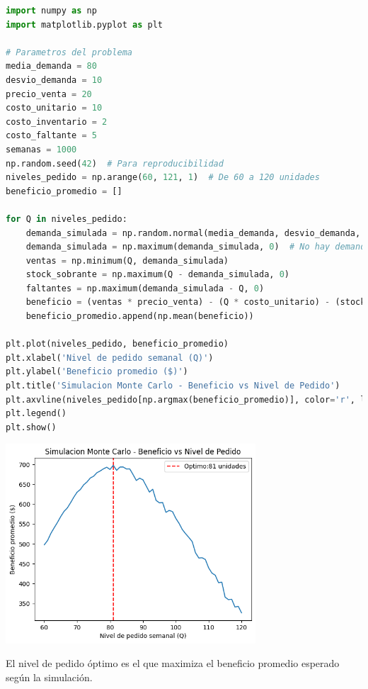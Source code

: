\documentclass[12pt]{article}
\begin{document}
\begin{lstlisting}[language=Python]
import numpy as np
import matplotlib.pyplot as plt

# Parametros del problema
media_demanda = 80
desvio_demanda = 10
precio_venta = 20
costo_unitario = 10
costo_inventario = 2
costo_faltante = 5
semanas = 1000
np.random.seed(42)  # Para reproducibilidad
niveles_pedido = np.arange(60, 121, 1)  # De 60 a 120 unidades
beneficio_promedio = []

for Q in niveles_pedido:
    demanda_simulada = np.random.normal(media_demanda, desvio_demanda, semanas).round().astype(int)
    demanda_simulada = np.maximum(demanda_simulada, 0)  # No hay demanda negativa
    ventas = np.minimum(Q, demanda_simulada)
    stock_sobrante = np.maximum(Q - demanda_simulada, 0)
    faltantes = np.maximum(demanda_simulada - Q, 0)
    beneficio = (ventas * precio_venta) - (Q * costo_unitario) - (stock_sobrante * costo_inventario) - (faltantes * costo_faltante)
    beneficio_promedio.append(np.mean(beneficio))

plt.plot(niveles_pedido, beneficio_promedio)
plt.xlabel('Nivel de pedido semanal (Q)')
plt.ylabel('Beneficio promedio ($)')
plt.title('Simulacion Monte Carlo - Beneficio vs Nivel de Pedido')
plt.axvline(niveles_pedido[np.argmax(beneficio_promedio)], color='r', linestyle='--', label=f'Optimo: {niveles_pedido[np.argmax(beneficio_promedio)]} unidades')
plt.legend()
plt.show()
\end{lstlisting}

\begin{center}
    \includegraphics[width=0.7\textwidth]{montecarlo.png}
\end{center}

El nivel de pedido óptimo es el que maximiza el beneficio promedio esperado según la simulación.
\end{document}
